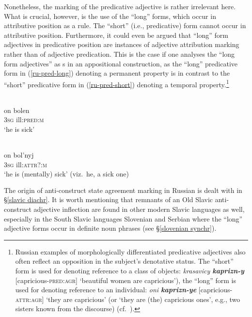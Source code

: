 Nonetheless, the marking of the predicative adjective is rather irrelevant here. What is crucial, however, is the use of the “long” forms, which occur in attributive position as a rule. The “short” (i.e., predicative) form cannot occur in attributive position. Furthermore, it could even be argued that “long” form adjectives in predicative position are instances of adjective attribution marking rather than of adjective predication. This is the case if one analyses the “long form adjectives” as s in an appositional construction, as the “long” predicative form in (\ref{ru-pred-long}) denoting a permanent property is in contrast to the “short” predicative form in (\ref{ru-pred-short}) denoting a temporal property.\footnote{Russian examples of morphologically differentiated predicative adjectives also often reflect an opposition in the subject's denotative status. The “short” form is used for denoting reference to a class of objects: \textit{krasavicy \textbf{kaprizn-y}} [capricious-\textsc{pred:agr}] ‘beautiful women are capricious’), the “long” form is used for denoting reference to an individual: \textit{oni \textbf{kaprizn-ye}} [capricious-\textsc{attr:agr}] ‘they are capricious’ (or ‘they are (the) capricious ones’, e.g., two sisters known from the discourse) (cf.~\citealt[210 Footnote 76]{mendoza2004}).}
\begin{exe}
\ex
{}
\begin{xlist}
\\
\label{ru-pred-short}
\gll on bolen\\
	3\textsc{sg} ill:\textsc{pred:m}\\
\glt	 ‘he is sick’

\newpage
{}\\
\label{ru-pred-long}
\gll on bol'nyj\\
	3\textsc{sg} ill:\textsc{attr?:m}\\
\glt	 ‘he is (mentally) sick’ (viz.~he, a sick one)
\end{xlist}
\end{exe}
The origin of anti\hyp{}construct state agreement marking in Russian is dealt with in \S\ref{slavic diachr}. It is worth mentioning that remnants of an Old Slavic anti\hyp{}construct adjective inflection are found in other modern Slavic languages as well, especially in the South Slavic languages Slovenian and Serbian where the “long” adjective forms occur in definite noun phrases (see \S\ref{slovenian synchr}).

